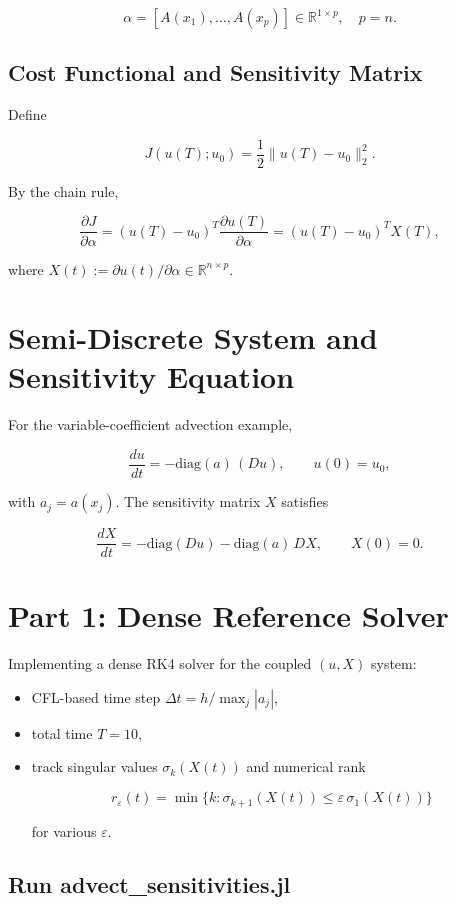 \documentclass[11pt]{report}
\begin{document}
\[
\alpha = [A(x_1),\dots,A(x_p)] \in \mathbb{R}^{1\times p},\quad p=n.
\]



\subsection{Cost Functional and Sensitivity Matrix}

Define


\[
J(u(T);u_0) = \frac{1}{2}\|u(T)-u_0\|_2^2.
\]


By the chain rule,


\[
\frac{\partial J}{\partial \alpha}
= (u(T)-u_0)^T \frac{\partial u(T)}{\partial \alpha}
= (u(T)-u_0)^T X(T),
\]


where \(X(t) := \partial u(t)/\partial \alpha \in \mathbb{R}^{n\times p}\).

\section{Semi-Discrete System and Sensitivity Equation}

For the variable-coefficient advection example,


\[
\frac{du}{dt} = -\mathrm{diag}(a)\, (D u),\qquad u(0)=u_0,
\]


with \(a_j = a(x_j)\). The sensitivity matrix \(X\) satisfies


\[
\frac{dX}{dt} = -\mathrm{diag}(D u) - \mathrm{diag}(a)\, D X,\qquad X(0)=0.
\]



\section{Part 1: Dense Reference Solver}

Implementing a dense RK4 solver for the coupled \((u,X)\) system:
\begin{itemize}[leftmargin=*]
    \item CFL-based time step \(\Delta t = h / \max_j |a_j|\),
    \item total time \(T=10\),
    \item track singular values \(\sigma_k(X(t))\) and numerical rank
    

\[
    r_\varepsilon(t) = \min\{k : \sigma_{k+1}(X(t)) \le \varepsilon\, \sigma_1(X(t))\}
    \]


    for various \(\varepsilon\).
\end{itemize}

\subsection{Run advect\_sensitivities.jl}
\end{document}
